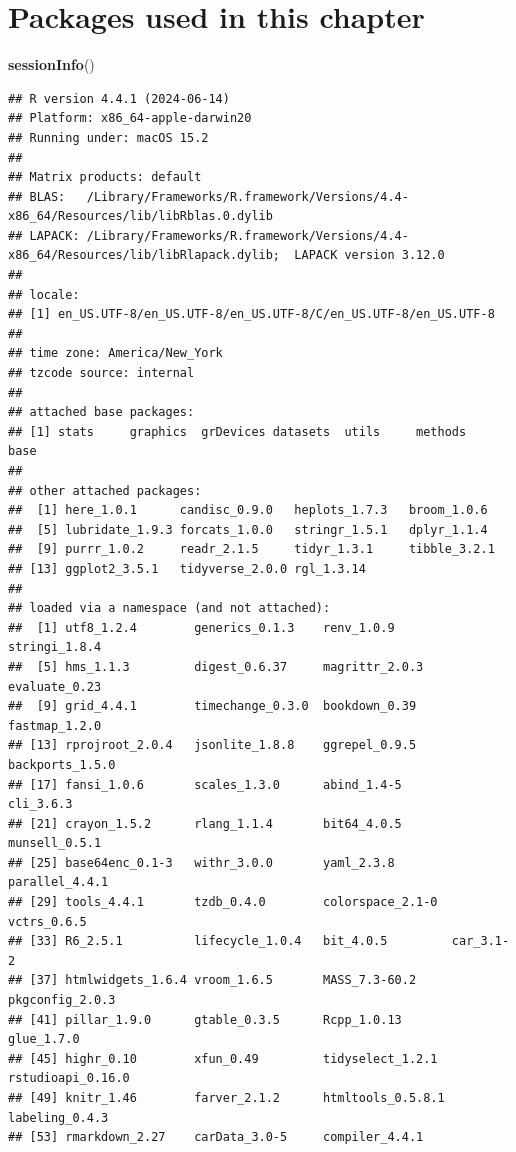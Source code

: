 \documentclass[
]{book}
\newenvironment{Shaded}{\begin{snugshade}}{\end{snugshade}}
\newcommand{\FunctionTok}[1]{\textcolor[rgb]{0.13,0.29,0.53}{\textbf{#1}}}
\newcommand{\NormalTok}[1]{#1}
\begin{document}
\section{Packages used in this chapter}\label{packages-used-in-this-chapter-4}

\begin{Shaded}
\begin{Highlighting}[]
\FunctionTok{sessionInfo}\NormalTok{()}
\end{Highlighting}
\end{Shaded}

\begin{verbatim}
## R version 4.4.1 (2024-06-14)
## Platform: x86_64-apple-darwin20
## Running under: macOS 15.2
## 
## Matrix products: default
## BLAS:   /Library/Frameworks/R.framework/Versions/4.4-x86_64/Resources/lib/libRblas.0.dylib 
## LAPACK: /Library/Frameworks/R.framework/Versions/4.4-x86_64/Resources/lib/libRlapack.dylib;  LAPACK version 3.12.0
## 
## locale:
## [1] en_US.UTF-8/en_US.UTF-8/en_US.UTF-8/C/en_US.UTF-8/en_US.UTF-8
## 
## time zone: America/New_York
## tzcode source: internal
## 
## attached base packages:
## [1] stats     graphics  grDevices datasets  utils     methods   base     
## 
## other attached packages:
##  [1] here_1.0.1      candisc_0.9.0   heplots_1.7.3   broom_1.0.6    
##  [5] lubridate_1.9.3 forcats_1.0.0   stringr_1.5.1   dplyr_1.1.4    
##  [9] purrr_1.0.2     readr_2.1.5     tidyr_1.3.1     tibble_3.2.1   
## [13] ggplot2_3.5.1   tidyverse_2.0.0 rgl_1.3.14     
## 
## loaded via a namespace (and not attached):
##  [1] utf8_1.2.4        generics_0.1.3    renv_1.0.9        stringi_1.8.4    
##  [5] hms_1.1.3         digest_0.6.37     magrittr_2.0.3    evaluate_0.23    
##  [9] grid_4.4.1        timechange_0.3.0  bookdown_0.39     fastmap_1.2.0    
## [13] rprojroot_2.0.4   jsonlite_1.8.8    ggrepel_0.9.5     backports_1.5.0  
## [17] fansi_1.0.6       scales_1.3.0      abind_1.4-5       cli_3.6.3        
## [21] crayon_1.5.2      rlang_1.1.4       bit64_4.0.5       munsell_0.5.1    
## [25] base64enc_0.1-3   withr_3.0.0       yaml_2.3.8        parallel_4.4.1   
## [29] tools_4.4.1       tzdb_0.4.0        colorspace_2.1-0  vctrs_0.6.5      
## [33] R6_2.5.1          lifecycle_1.0.4   bit_4.0.5         car_3.1-2        
## [37] htmlwidgets_1.6.4 vroom_1.6.5       MASS_7.3-60.2     pkgconfig_2.0.3  
## [41] pillar_1.9.0      gtable_0.3.5      Rcpp_1.0.13       glue_1.7.0       
## [45] highr_0.10        xfun_0.49         tidyselect_1.2.1  rstudioapi_0.16.0
## [49] knitr_1.46        farver_2.1.2      htmltools_0.5.8.1 labeling_0.4.3   
## [53] rmarkdown_2.27    carData_3.0-5     compiler_4.4.1
\end{verbatim}
\end{document}
